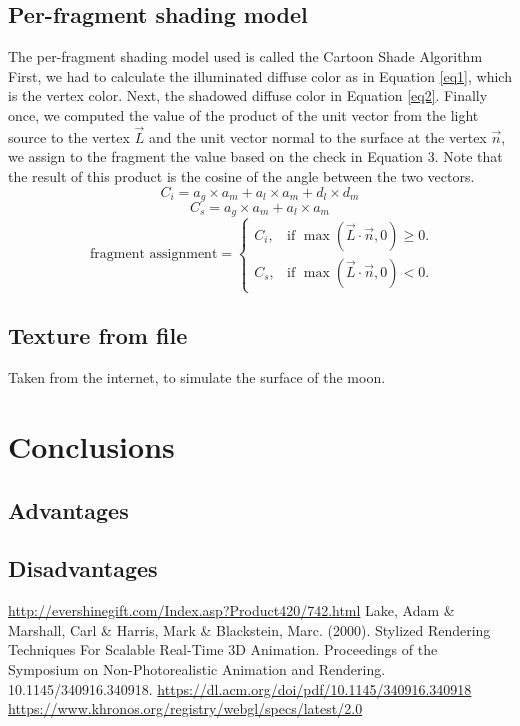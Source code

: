 \documentclass[12pt,a4paper]{article}
\begin{document}
\subsection{Per-fragment shading model}
The per-fragment shading model used is called the Cartoon Shade Algorithm \cite{shade}
First, we had to calculate the illuminated diffuse color as in Equation \ref{eq1}, which is the vertex color. Next, the shadowed diffuse color in Equation \ref{eq2}. Finally once, we computed the value of the product of the unit vector from the light source to the vertex $\overrightarrow{L}$ and the unit vector
normal to the surface at the vertex  $\overrightarrow{n}$, we assign to the fragment the value based on the check in Equation 3. Note that the result of this product is the cosine of the angle between the two vectors.
\begin{equation}\label{eq1}
C_i = a_g \times a_m + a_l \times a_m + d_l \times d_m  
\end{equation}
\begin{equation}\label{eq2}
C_s =  a_g \times a_m + a_l \times a_m
\end{equation}
\begin{equation}\label{eq3}
\text{ fragment assignment} =\begin{cases}
    C_i, & \text{if $\max(\overrightarrow{L} \cdot \overrightarrow{n}, 0)\geq0$}.\\
    C_s, & \text{if $\max(\overrightarrow{L} \cdot \overrightarrow{n}, 0)<0$}.
  \end{cases}
\end{equation}

\subsection{Texture from file}
Taken from the internet, to simulate the surface of the moon.
\section{Conclusions}
\subsection{Advantages}
%
\subsection{Disadvantages}


\begin{thebibliography}{1}

   \url{http://evershinegift.com/Index.asp?Product420/742.html}
 Lake, Adam \& Marshall, Carl \& Harris, Mark \& Blackstein, Marc. (2000). Stylized Rendering Techniques For Scalable Real-Time 3D Animation. Proceedings of the Symposium on Non-Photorealistic Animation and Rendering. 10.1145/340916.340918.  \url{https://dl.acm.org/doi/pdf/10.1145/340916.340918}
 \url{https://www.khronos.org/registry/webgl/specs/latest/2.0}

\end{thebibliography}
\end{document}
